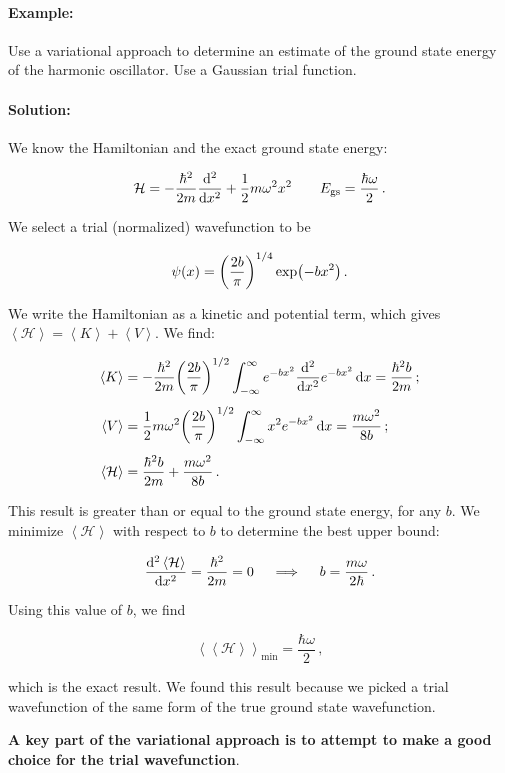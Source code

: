 \documentclass[12pt, titlepage]{article}
\newcommand{\exv}[1]{\left\langle #1 \right\rangle}
\begin{document}
\begin{mdframed}[backgroundcolor=gray!20]
\paragraph*{Example:}
Use a variational approach to determine an estimate of the ground state energy of the harmonic oscillator. Use a Gaussian trial function.

\paragraph*{Solution:}
We know the Hamiltonian and the exact ground state energy:

\begin{equation*}
	\mathcal{H} = -\frac{\hbar^2}{2m}\dv[2]{x} + \frac{1}{2}m\omega^2x^2 \qquad E_\text{gs} = \frac{\hbar\omega}{2} \,.
\end{equation*}

We select a trial (normalized) wavefunction to be

\begin{equation*}
	\psi(x) = \qty(\frac{2b}{\pi})^{1/4}\exp(-bx^2) \,.
\end{equation*}

We write the Hamiltonian as a kinetic and potential term, which gives $\exv{\mathcal{H}} = \exv{K} + \exv{V}$. We find:

\begin{align*}
	\exv{K} &= -\frac{\hbar^2}{2m}\qty(\frac{2b}{\pi})^{1/2}\int_{-\infty}^{\infty}e^{-bx^2}\dv[2]{x}e^{-bx^2}\dd{x} = \frac{\hbar^2 b}{2m} \,; \\[4pt]
	\exv{V} &= \frac{1}{2}m\omega^2\qty(\frac{2b}{\pi})^{1/2}\int_{-\infty}^{\infty}x^2e^{-bx^2}\dd{x} = \frac{m\omega^2}{8b} \,; \\[4pt]
	\exv{\mathcal{H}} &= \frac{\hbar^2b}{2m} + \frac{m\omega^2}{8b} \,.
\end{align*}

This result is greater than or equal to the ground state energy, for any $b$. We minimize $\exv{\mathcal{H}}$ with respect to $b$ to determine the best upper bound:

\begin{equation}
	\dv[2]{\exv{\mathcal{H}}}{x} = \frac{\hbar^2}{2m} = 0 \quad\implies\quad b = \frac{m\omega}{2\hbar} \,.
\end{equation}

Using this value of $b$, we find

\begin{equation*}
	\exv{\exv{\mathcal{H}}}_\text{min} = \frac{\hbar\omega}{2} \,,
\end{equation*}

which is the exact result. We found this result because we picked a trial wavefunction of the same form of the true ground state wavefunction.

\textbf{A key part of the variational approach is to attempt to make a good choice for the trial wavefunction}.
\end{mdframed}
\end{document}

